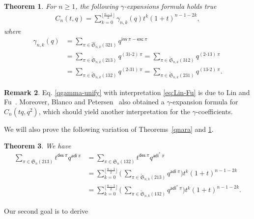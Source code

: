\documentclass[12pt,reqno]{amsart}
\numberwithin{equation}{section}
\theoremstyle{plain}
\newtheorem{theorem}{Theorem}[section]
\theoremstyle{definition}
\newtheorem{remark}[theorem]{Remark}
\def\S{\mathfrak{S}}
\def\exc{\mathsf{exc}}
\def\ai{\mathsf{adi}}
\def\des{\mathsf{des}}
\def\inv{\mathsf{inv}}
\def\cab{31\text{-}2}
\def\bca{2\text{-}31}
\def\acb{13\text{-}2}
\def\bac{2\text{-}13}
\begin{document}
\begin{theorem}\label{thm:des-ai-qgamma}
For  $n\geq1$, the following $\gamma$-expansions formula holds true
\begin{align}\label{qgamma-unify}
C_n(t,q)=\sum_{k=0}^{\lfloor \frac{n-1}{2}\rfloor}
\gamma_{n,k}(q)t^k(1+t)^{n-1-2k},
\end{align}
where
\begin{align}
\gamma_{n,k}(q)&=\sum_{\pi\in\widehat{\S}_{n,k}(321)}q^{\inv\:\pi-\exc\:\pi}\label{eq:Lin-Fu}\\
&=\sum_{\pi\in\widetilde{\S}_{n,k}(213)}q^{(\cab)\:\pi}
=\sum_{\pi\in\widetilde{\S}_{n,k}(312)}q^{(\bac)\:\pi}\label{eq:213:312}\\
&=\sum_{\pi\in\widetilde{\S}_{n,k}(132)}q^{(\bca)\:\pi}
=\sum_{\pi\in\widetilde{\S}_{n,k}(231)}q^{(\acb)\:\pi}\label{eq:231:132}.
\end{align}
\end{theorem}
\begin{remark}
Eq. \eqref{qgamma-unify} with interpretation \eqref{eq:Lin-Fu} is due to Lin and Fu~\cite{LF17}. Moreover, Blanco and Petersen~\cite{BP14} also obtained a $\gamma$-expansion formula for $C_n(tq,q^2)$, which should yield another interpretation for the $\gamma$-coefficients.
\end{remark}









We will also prove the following variation of Theorems~\ref{qnara} and \ref{thm:des-ai-qgamma}.

\begin{theorem}\label{thm:des-ai-qgamma-new} We have
\begin{align}
\label{213--132}
\sum_{\pi\in \S_{n}(213)}t^{\des\:\pi}q^{\ai\:\pi}&=
\sum_{\pi\in \S_{n}(132)}t^{\des\:\pi}q^{\ai^*\:\pi}\\
\label{213--ai}

&=\sum_{k=0}^{\lfloor \frac{n-1}{2}\rfloor}\biggl(\:\sum_{\pi\in\widetilde{\S}_{n,k}(213)}q^{\ai\:\pi}\biggr)t^k(1+t)^{n-1-2k}\\
\label{132--ai}

&=\sum_{k=0}^{\lfloor \frac{n-1}{2}\rfloor}\biggl(\:\sum_{\pi\in\widetilde{\S}_{n,k}(132)}q^{\ai^*\:\pi}\biggr)t^k(1+t)^{n-1-2k}.
\end{align}
\end{theorem}

Our second goal is to derive
\end{document}
